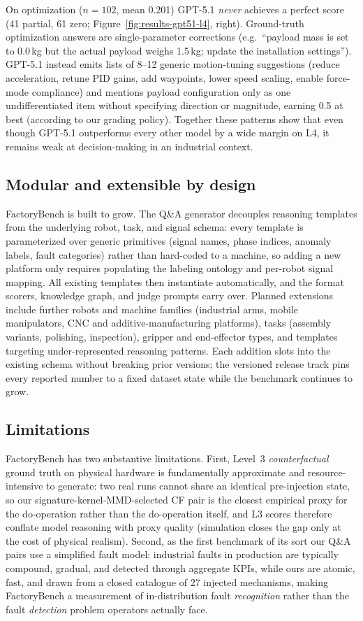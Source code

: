 \documentclass{article}
\begin{document}
On optimization ($n{=}102$, mean 0.201) GPT-5.1 \emph{never} achieves a perfect score (41 partial, 61 zero; Figure~\ref{fig:results-gpt51-l4}, right). Ground-truth optimization answers are single-parameter corrections (e.g.\ ``payload mass is set to 0.0\,kg but the actual payload weighs 1.5\,kg; update the installation settings''). GPT-5.1 instead emits lists of 8--12 generic motion-tuning suggestions (reduce acceleration, retune PID gains, add waypoints, lower speed scaling, enable force-mode compliance) and mentions payload configuration only as one undifferentiated item without specifying direction or magnitude, earning 0.5 at best (according to our grading policy). Together these patterns show that even though GPT-5.1 outperforms every other model by a wide margin on L4, it remains weak at decision-making in an industrial context.

\subsection{Modular and extensible by design}

FactoryBench is built to grow. The Q\&A generator decouples reasoning templates from the underlying robot, task, and signal schema: every template is parameterized over generic primitives (signal names, phase indices, anomaly labels, fault categories) rather than hard-coded to a machine, so adding a new platform only requires populating the labeling ontology and per-robot signal mapping. All existing templates then instantiate automatically, and the format scorers, knowledge graph, and judge prompts carry over. Planned extensions include further robots and machine families (industrial arms, mobile manipulators, CNC and additive-manufacturing platforms), tasks (assembly variants, polishing, inspection), gripper and end-effector types, and templates targeting under-represented reasoning patterns. Each addition slots into the existing schema without breaking prior versions; the versioned release track pins every reported number to a fixed dataset state while the benchmark continues to grow.

\subsection{Limitations}

FactoryBench has two substantive limitations. First, Level~3 \emph{counterfactual} ground truth on physical hardware is fundamentally approximate and resource-intensive to generate: two real runs cannot share an identical pre-injection state, so our signature-kernel-MMD-selected CF pair is the closest empirical proxy for the do-operation rather than the do-operation itself, and L3 scores therefore conflate model reasoning with proxy quality (simulation closes the gap only at the cost of physical realism). Second, as the first benchmark of its sort our Q\&A pairs use a simplified fault model: industrial faults in production are typically compound, gradual, and detected through aggregate KPIs, while ours are atomic, fast, and drawn from a closed catalogue of 27 injected mechanisms, making FactoryBench a measurement of in-distribution fault \emph{recognition} rather than the fault \emph{detection} problem operators actually face.
\end{document}
